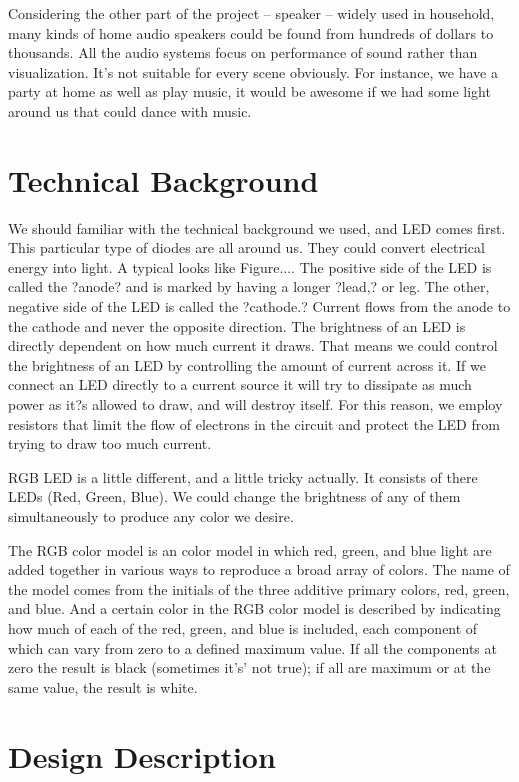 \documentclass[12pt,a4paper,journal]{IEEEtran}
\begin{document}
Considering the other part of the project -- speaker -- widely used in household, many kinds of home audio speakers could be found from hundreds of dollars to thousands. All the audio systems focus on performance of sound rather than visualization. It's not suitable for every scene obviously. For instance, we have a party at home as well as play music, it would be awesome if we had some light around us that could dance with music.

\section{Technical Background}

We should familiar with the technical background we used, and LED comes first. This particular type of diodes are all around us. They could convert electrical energy into light. A typical looks like Figure.... The positive side of the LED is called the ?anode? and is marked by having a longer ?lead,? or leg. The other, negative side of the LED is called the ?cathode.? Current flows from the anode to the cathode and never the opposite direction. The brightness of an LED is directly dependent on how much current it draws. That means we could control the brightness of an LED by controlling the amount of current across it. If we connect an LED directly to a current source it will try to dissipate as much power as it?s allowed to draw, and will destroy itself. For this reason, we employ resistors that limit the flow of electrons in the circuit and protect the LED from trying to draw too much current.

RGB LED is a little different, and a little tricky actually. It consists of there LEDs (Red, Green, Blue). We could change the brightness of any of them simultaneously to produce any color we desire.

The RGB color model is an color model in which red, green, and blue light are added together in various ways to reproduce a broad array of colors. The name of the model comes from the initials of the three additive primary colors, red, green, and blue. And a certain color in the RGB color model is described by indicating how much of each of the red, green, and blue is included, each component of which can vary from zero to a defined maximum value. If all the components at zero the result is black (sometimes it's' not true); if all are maximum or at the same value, the result is white. 

\section{Design Description}
\end{document}
